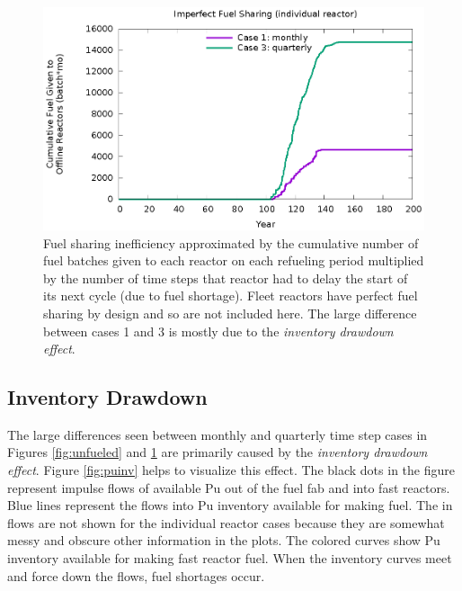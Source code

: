 \documentclass{style}
\begin{document}
\begin{figure}[!h]
    \centering
    \includegraphics[width=1.0\columnwidth]{exp2/badshare.eps}
    \caption[Cumulative unnecessary idling fuel]{
        Fuel sharing inefficiency approximated by the cumulative number of
        fuel batches given to each reactor on each refueling period multiplied
        by the number of time steps that reactor had to delay the start of its
        next cycle (due to fuel shortage).  Fleet reactors have perfect fuel
        sharing by design and so are not included here. The large difference
        between cases 1 and 3 is mostly due to the \emph{inventory drawdown
        effect}. 
    }
    \label{fig:badshare}
\end{figure}

\subsection{Inventory Drawdown}

The large differences seen between monthly and quarterly time step cases in
Figures \ref{fig:unfueled} and \ref{fig:badshare} are
primarily caused by the \emph{inventory drawdown effect}.  Figure
\ref{fig:puinv} helps to visualize this effect.  The black dots in
the figure represent impulse flows of available Pu out of the fuel fab and
into fast reactors.  Blue lines represent the flows into Pu inventory
available for making fuel. The in flows are not shown for the individual
reactor cases because they are somewhat messy and obscure other information in
the plots. The colored curves show Pu inventory available for making fast
reactor fuel.  When the inventory curves meet and force down the flows, fuel
shortages occur. 
\end{document}
